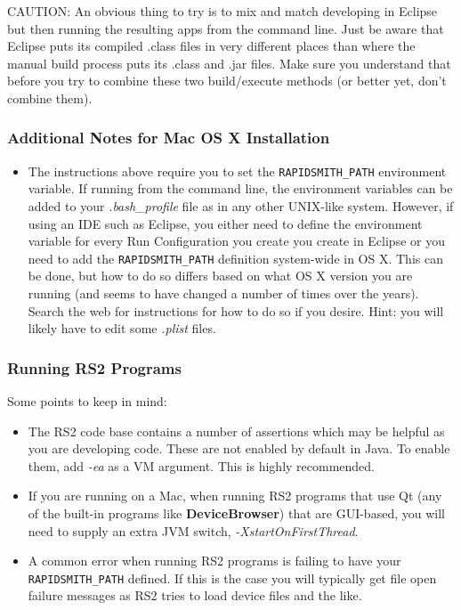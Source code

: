 \documentclass[12pt]{article}
\newcommand{\env}[1]{{\texttt{#1}}}
\newcommand{\fil}[1]{{\em #1}}
\newcommand{\opt}[1]{{\em #1}}
\newcommand{\pgm}[1]{{\textbf{#1}}}
\begin{document}
CAUTION: An obvious thing to try is to mix and match developing in Eclipse but
then running the resulting apps from the command line.  Just be aware that Eclipse
puts its compiled .class files in very different places than where the manual
build process puts its .class and .jar files.  Make sure you understand that
before you try to combine these two build/execute methods (or better yet, don't
combine them).

\subsubsection{Additional Notes for Mac OS X Installation}
\begin{itemize}
  \item The instructions above require you to set the \env{RAPIDSMITH\_PATH}
  environment variable.  If running from the command line, the environment
  variables can be added to your \fil{.bash\_profile} file as in any other
  UNIX-like system.  However, if using an IDE such as Eclipse, you either need to define
  the environment variable for every Run Configuration you create you create in
  Eclipse or you need to add the \env{RAPIDSMITH\_PATH} definition system-wide
  in OS X.
  This can be done, but how to do so differs based on what OS X version you are
  running (and seems to have changed a number of times over the years).  Search
  the web for instructions for how to do so if you desire.   Hint: you will
  likely have to edit some \fil{.plist} files.
\end{itemize}

\subsubsection{Running RS2 Programs}
Some points to keep in mind:
\begin{itemize}
  \item The RS2 code base contains a number of assertions which may be helpful  
  as you are developing code.  These are not enabled by default in Java.  To
  enable them, add \opt{-ea} as a VM argument.  This is highly recommended.
  \item If you are running on a Mac, when running RS2 programs that use Qt  (any
  of the built-in programs like \pgm{DeviceBrowser}) that are GUI-based, you
  will need to supply an extra JVM switch, \opt{-XstartOnFirstThread}.
  \item A common error when running RS2 programs is failing to have your
  \env{RAPIDSMITH\_PATH} defined.  If this is the case you will typically get
  file open failure messages as RS2 tries to load device files and the like.
\end{itemize}
\end{document}
